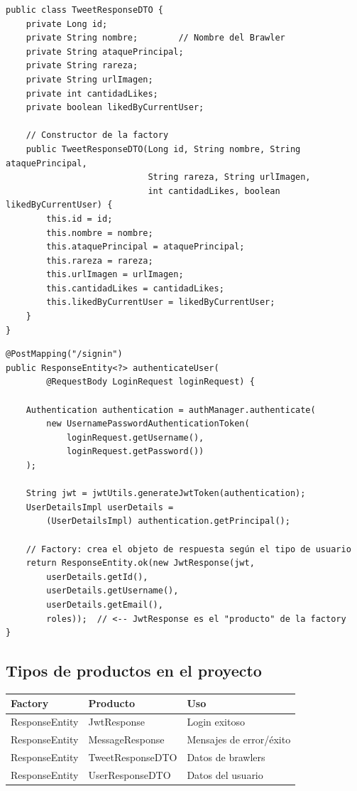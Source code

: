 \documentclass[12pt,a4paper]{article}
\begin{document}
\begin{lstlisting}[caption={TweetResponseDTO.java -- Objeto producto de la factory}]
public class TweetResponseDTO {
    private Long id;
    private String nombre;        // Nombre del Brawler
    private String ataquePrincipal;
    private String rareza;
    private String urlImagen;
    private int cantidadLikes;
    private boolean likedByCurrentUser;

    // Constructor de la factory
    public TweetResponseDTO(Long id, String nombre, String ataquePrincipal,
                            String rareza, String urlImagen,
                            int cantidadLikes, boolean likedByCurrentUser) {
        this.id = id;
        this.nombre = nombre;
        this.ataquePrincipal = ataquePrincipal;
        this.rareza = rareza;
        this.urlImagen = urlImagen;
        this.cantidadLikes = cantidadLikes;
        this.likedByCurrentUser = likedByCurrentUser;
    }
}
\end{lstlisting}

\begin{lstlisting}[caption={AuthController.java -- Uso del patrón Factory para respuestas}]
@PostMapping("/signin")
public ResponseEntity<?> authenticateUser(
        @RequestBody LoginRequest loginRequest) {

    Authentication authentication = authManager.authenticate(
        new UsernamePasswordAuthenticationToken(
            loginRequest.getUsername(),
            loginRequest.getPassword())
    );

    String jwt = jwtUtils.generateJwtToken(authentication);
    UserDetailsImpl userDetails =
        (UserDetailsImpl) authentication.getPrincipal();

    // Factory: crea el objeto de respuesta según el tipo de usuario
    return ResponseEntity.ok(new JwtResponse(jwt,
        userDetails.getId(),
        userDetails.getUsername(),
        userDetails.getEmail(),
        roles));  // <-- JwtResponse es el "producto" de la factory
}
\end{lstlisting}

\subsection{Tipos de productos en el proyecto}

\begin{center}
\begin{tabular}{|l|l|l|}
\hline
\rowcolor{bsDark!15}\textbf{Factory} & \textbf{Producto} & \textbf{Uso} \\
\hline
ResponseEntity & JwtResponse & Login exitoso \\
\hline
ResponseEntity & MessageResponse & Mensajes de error/\'exito \\
\hline
ResponseEntity & TweetResponseDTO & Datos de brawlers \\
\hline
ResponseEntity & UserResponseDTO & Datos del usuario \\
\hline
\end{tabular}
\end{center}
\end{document}
